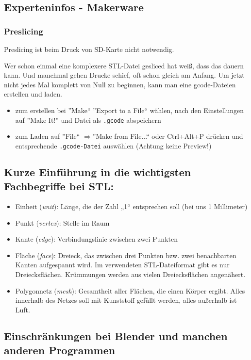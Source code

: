 \documentclass{\basedir/fablab-document}
\newcommand{\fachbegriff}[1]{(\textit{#1})}
\newcommand{\ra}{$\Rightarrow$}
\begin{document}
	\subsection{Experteninfos - Makerware} \label{expinfos}
	\subsubsection{Preslicing}
	Preslicing ist beim Druck von SD-Karte nicht notwendig.
	
	Wer schon einmal eine komplexere STL-Datei gesliced hat weiß, dass das dauern kann. Und manchmal gehen Drucke schief,
	oft schon gleich am Anfang. Um jetzt nicht jedes Mal komplett von Null zu beginnen, kann man eine gcode-Dateien erstellen
	und laden.
	\begin{itemize}
		\item zum erstellen bei ''Make`` ''Export to a File`` wählen, nach den Einstellungen auf ''Make It!'' und Datei als \texttt{.gcode} abspeichern
		\item zum Laden auf ''File`` \ra ''Make from File...`` oder Ctrl+Alt+P drücken und entsprechende \texttt{.gcode-Datei} auswählen (Achtung keine Preview!)
	\end{itemize}
	
	\subsection{Kurze Einführung in die wichtigsten Fachbegriffe bei STL:}
	
	\begin{itemize}
		\item Einheit \fachbegriff{unit}: Länge, die der Zahl „1“ entsprechen soll (bei uns
		1 Millimeter)
		\item Punkt \fachbegriff{vertex}: Stelle im Raum
		\item Kante \fachbegriff{edge}: Verbindungslinie zwischen zwei Punkten
		\item Fläche \fachbegriff{face}: Dreieck, das zwischen drei Punkten bzw. zwei
		benachbarten Kanten aufgespannt wird. Im verwendeten STL-Dateiformat
		gibt es nur Dreiecksflächen. Krümmungen werden aus vielen
		Dreiecksflächen angenähert.
		\item Polygonnetz \fachbegriff{mesh}: Gesamtheit aller Flächen, die einen Körper
		ergibt. Alles innerhalb des Netzes soll mit Kunststoff gefüllt werden,
		alles außerhalb ist Luft.
	\end{itemize}
	
	\subsection{Einschränkungen bei Blender und manchen anderen Programmen} \label{lowlevel-einschraenkungen}
	
\end{document}
